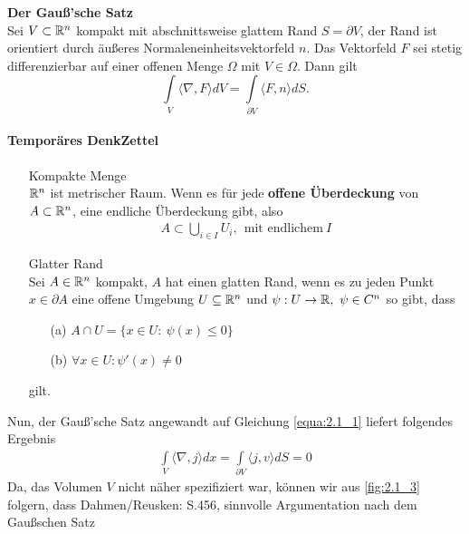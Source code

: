 \begin{Definition}
	\textbf{Der Gauß'sche Satz} \\
	Sei $V \subset	\mathbb{R}^n$ kompakt mit abschnittsweise glattem Rand $S = \partial V$, der Rand ist orientiert durch äußeres Normaleneinheitsvektorfeld $n$. Das Vektorfeld $F$ sei stetig differenzierbar auf einer offenen Menge $\Omega$ mit $V \in \Omega$. Dann gilt
	\begin{equation}
		\int\limits_{V} \langle \nabla,F \rangle dV = \int\limits_{\partial V} \langle F,n \rangle
		 dS.
		 \label{fig:2.1_2}
	\end{equation}
\end{Definition}

\begin{framed}
	\paragraph{Temporäres DenkZettel}

	\begin{itemize}
		\item[] \begin{Definition}
			Kompakte Menge \\
			$\mathbb{R}^n$ ist metrischer Raum. Wenn es für jede \textbf{offene Überdeckung} von $A \subset \mathbb{R}^n$, eine endliche Überdeckung gibt, also 
			\begin{eqnarray*}
				A \subset \bigcup\limits_{i \in I} U_i, \ \ \mbox{mit endlichem} \ I
			\end{eqnarray*} 			
		\end{Definition}
		\item[] \begin{Definition}
			Glatter Rand \\
			Sei $A \in \mathbb{R}^n$ kompakt, $A$ hat einen glatten Rand, wenn es zu jeden Punkt $x \in \partial A$ eine offene Umgebung $U \subseteq \mathbb{R}^n$ und $\psi : U \rightarrow \mathbb{R}, \ \psi \in C^n$ so gibt, dass 
			\begin{itemize}
				\item [(a)] $A \cap U = \{x \in U : \ \psi(x) \leq 0 \}$ 
				\item [(b)] $\forall x \in U : \psi'(x) \neq 0$
			\end{itemize}
			gilt.
		\end{Definition}		
	\end{itemize}
\end{framed}

Nun, der Gauß'sche Satz angewandt auf Gleichung \ref{equa:2.1_1} liefert folgendes Ergebnis
\begin{eqnarray}
	\int\limits_{V} \langle \nabla, j \rangle dx = \int\limits_{\partial V} \langle j, v \rangle dS = 0
	\label{fig:2.1_3}
\end{eqnarray}
Da, das Volumen $V$ nicht näher spezifiziert war, können wir aus \ref{fig:2.1_3} folgern, dass
{\color{red} Dahmen/Reusken: S.456, sinnvolle Argumentation nach dem Gaußschen Satz} \\

